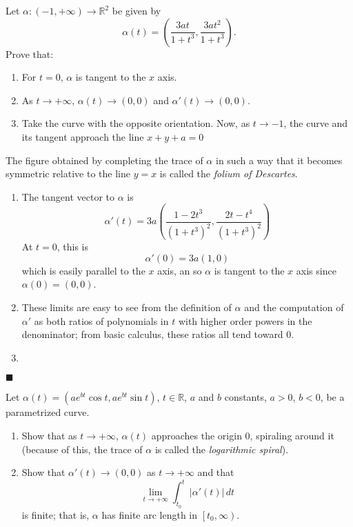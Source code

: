 \documentclass[12pt]{article}
\renewcommand{\qed}{\hfill$\blacksquare$}
\renewenvironment{proof}{\begin{addmargin}[1em]{0em}\begin{newproof}}{\end{newproof}\end{addmargin}\qed}
\newenvironment{problem}[2][Exercise]{\begin{trivlist}
\item[\hskip \labelsep {\bfseries #1}\hskip \labelsep {\bfseries #2.}]}{\end{trivlist}}
\begin{document}
\begin{problem}{1.3.5}
Let $\alpha: \left(-1,+\infty\right)\rightarrow \mathbb{R}^2$ be given by \[ \alpha\left(t\right) = \left( \frac{3at}{1+t^3}, \frac{3at^2}{1+t^3}\right).\] Prove that:
\begin{enumerate}[label=(\alph*)]
	\item For $t=0$, $\alpha$ is tangent to the $x$ axis.
	\item As $t\rightarrow + \infty$,  $\alpha\left(t\right)\rightarrow \left(0,0\right)$ and $\alpha'\left(t\right) \rightarrow \left(0,0\right)$.
	\item Take the curve with the opposite orientation. Now, as $t\rightarrow -1$, the curve and its tangent approach the line $x+y+a=0$
\end{enumerate}
The figure obtained by completing the trace of $\alpha$ in such a way that it becomes symmetric relative to the line $y=x$ is called the \textit{folium of Descartes}.
\end{problem}

\begin{proof}
\begin{enumerate}[label=(\alph*)]
	\item The tangent vector to $\alpha$ is 
		\[ \alpha'\left(t\right)  = 3a\left( \frac{1 - 2t^3}{\left( 1+t^3\right)^2} ,  \frac{ 2t -t^4  }{\left(1+t^3\right)^2} \right) \] At $t=0$, this is \[ \alpha'\left(0\right) = 3a \left(1,0\right) \] which is easily parallel to the $x$ axis, an so $\alpha$ is tangent to the $x$ axis since $\alpha\left(0\right) = \left(0,0\right)$. 
		
	\item These limits are easy to see from the definition of $\alpha$ and the computation of $\alpha'$ as both ratios of polynomials in $t$ with higher order powers in the denominator; from basic calculus, these ratios all tend toward $0$.
	
	\item 
\end{enumerate}
\end{proof}








\begin{problem}{1.3.6}
Let $\alpha\left(t\right) = \left( ae^{bt}\cos t, ae^{bt}\sin t \right)$, $t\in \mathbb{R}$, $a$ and $b$ constants, $a>0$, $b<0$, be a parametrized curve.
\begin{enumerate}[label=(\alph*)]
	\item Show that as $t\rightarrow +\infty$, $\alpha\left(t\right)$ approaches the origin $0$, spiraling around it (because of this, the trace of $\alpha$ is called the \textit{logarithmic spiral}).
	\item Show that $\alpha'\left(t\right)\rightarrow \left(0,0\right)$ as $t\rightarrow +\infty$ and that \[ \lim_{t\rightarrow +\infty} \int_{t_0}^t \left| \alpha'\left(t\right) \right| \, dt \] is finite; that is, $\alpha$ has finite arc length in $\left[ t_0, \infty\right)$.
\end{enumerate}
\end{problem}
\end{document}
